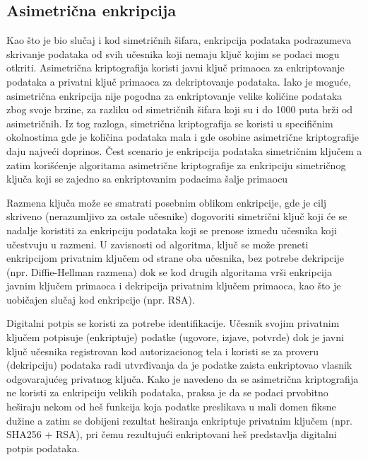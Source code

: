 \documentclass[a4paper]{article}
\begin{document}
\subsection{Asimetrična enkripcija}
\label{subsec:enkripcija}
Kao što je bio slučaj i kod simetričnih šifara, enkripcija podataka podrazumeva skrivanje podataka od svih učesnika koji nemaju ključ kojim se podaci mogu otkriti. Asimetrična
kriptografija koristi javni ključ primaoca za enkriptovanje podataka a privatni ključ primaoca za dekriptovanje podataka. Iako je moguće, asimetrična enkripcija nije pogodna za enkriptovanje  velike količine podataka zbog svoje brzine, za razliku od simetričnih šifara koji su i do 1000 puta brži od asimetričnih. Iz tog razloga, simetrična kriptografija se koristi u specifičnim okolnostima gde je količina podataka mala i gde osobine asimetrične kriptografije daju najveći doprinos.
Čest scenario je enkripcija podataka simetričnim ključem a zatim
korišćenje algoritama asimetrične kriptografije za enkripciju simetričnog ključa koji se zajedno sa enkriptovanim podacima šalje primaocu

Razmena ključa može se smatrati posebnim oblikom enkripcije, gde je cilj skriveno (nerazumljivo za ostale učesnike) dogovoriti simetrični ključ koji će se nadalje koristiti za enkripciju podataka koji se prenose između učesnika koji učestvuju u razmeni. U zavisnosti od algoritma, ključ se može preneti enkripcijom privatnim ključem od strane oba učesnika, bez potrebe dekripcije (npr. Diffie-Hellman razmena) dok se kod drugih algoritama vrši enkripcija javnim ključem primaoca i dekripcija privatnim ključem primaoca, kao što je uobičajen slučaj kod enkripcije (npr. RSA). 

Digitalni potpis se koristi za potrebe identifikacije. Učesnik svojim privatnim ključem potpisuje (enkriptuje) podatke (ugovore, izjave, potvrde) dok je javni ključ učesnika
registrovan kod autorizacionog tela i koristi se za proveru (dekripciju) podataka radi utvrđivanja da je podatke zaista enkriptovao vlasnik odgovarajućeg privatnog ključa. Kako je
navedeno da se asimetrična kriptografija ne koristi za enkripciju velikih podataka, praksa je da se podaci prvobitno heširaju nekom od heš funkcija koja podatke preslikava u mali domen fiksne dužine a zatim se dobijeni rezultat heširanja enkriptuje privatnim ključem (npr. SHA256 + RSA), pri čemu rezultujući enkriptovani heš predstavlja digitalni potpis podataka. 
\end{document}
